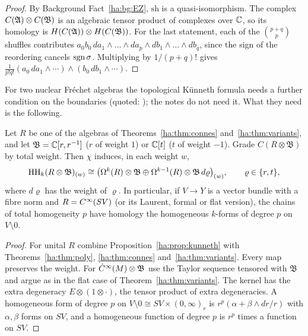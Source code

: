\begin{proof}
By Background Fact~\ref{ha:bg:EZ}, \(\mathrm{sh}\) is a quasi-isomorphism.
The complex \(C(\mathfrak A)\otimes C(\mathfrak B)\) is an algebraic tensor product
of complexes over \(\mathbb C\), so its homology is \(H(C(\mathfrak A))\otimes
H(C(\mathfrak B))\). For the last statement, each of the
\(\binom{p+q}p\) shuffles contributes
\(a_0b_0\,da_1\wedge\dots\wedge da_p\wedge db_1\wedge\dots\wedge db_q\),
since the sign of the reordering cancels \(\operatorname{sgn}\sigma\). Multiplying by
\(1/(p+q)!\) gives \(\frac1{p!q!}(a_0\,da_1\wedge\cdots)\wedge(b_0\,db_1
\wedge\cdots)\).
\end{proof}

For two nuclear Fr\'echet algebras the topological Künneth formula needs
a further condition on the boundaries (quoted: \cite{Karoubi}); the notes
do not need it. What they need is the following.

\begin{corollary}\label{ha:cor:homog}
Let \(R\) be one of the algebras of Theorems~\ref{ha:thm:connes}
and~\ref{ha:thm:variants}, and let \(\mathfrak B=\mathbb C[r,r^{-1}]\) (\(r\) of
weight \(1\)) or \(\mathbb C[t]\) (\(t\) of weight \(-1\)). Grade
\(C(R\otimes\mathfrak B)\) by total weight. Then \(\chi\) induces, in each
weight \(w\),
\[
 \operatorname{HH}_k(R\otimes\mathfrak B)_{(w)}\cong\bigl(\Omega^k(R)\otimes\mathfrak B
 \oplus\Omega^{k-1}(R)\otimes\mathfrak B\,d\varrho\bigr)_{(w)},\qquad
 \varrho\in\{r,t\},
\]
where \(d\varrho\) has the weight of \(\varrho\). In particular, if \(V\to
Y\) is a vector bundle with a fibre norm and \(R=C^\infty(SV)\) (or its Laurent,
formal or flat version), the chains of total homogeneity \(p\) have
homology the homogeneous \(k\)-forms of degree \(p\) on \(V\setminus0\).
\end{corollary}

\begin{proof}
For unital \(R\) combine Proposition~\ref{ha:prop:kunneth} with
Theorems~\ref{ha:thm:poly}, \ref{ha:thm:connes}
and~\ref{ha:thm:variants}. Every map preserves the weight. For
\(\dot C^\infty(M)\otimes\mathfrak B\) use the Taylor sequence tensored with
\(\mathfrak B\) and argue as in the flat case of
Theorem~\ref{ha:thm:variants}. The kernel has the extra degeneracy
\(E\otimes(1\otimes\cdot)\), the tensor product of extra degeneracies. A
homogeneous form of degree \(p\) on \(V\setminus0\cong SV\times(0,\infty)
_r\) is \(r^p(\alpha+\beta\wedge dr/r)\) with \(\alpha,\beta\) forms on
\(SV\), and a homogeneous function of degree \(p\) is \(r^p\) times a
function on \(SV\).
\end{proof}

